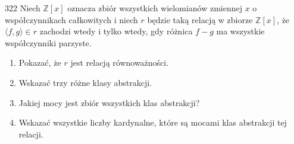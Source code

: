 \documentclass{../note}
\begin{document}
\begin{zadanie}{322}
Niech $\mathbb{Z}[x]$ oznacza zbiór wszystkich wielomianów zmiennej $x$ o współczynnikach całkowitych i niech $r$ będzie taką relacją w zbiorze $\mathbb{Z}[x]$, że $\langle f,g\rangle\in r$ zachodzi wtedy i tylko wtedy, gdy różnica $f-g$ ma wszystkie współczynniki parzyste.
\begin{enumerate}
    \item[(a)] Pokazać, że $r$ jest relacją równoważności.
    \item[(b)] Wskazać trzy różne klasy abstrakcji.
    \item[(c)] Jakiej mocy jest zbiór wszystkich klas abstrakcji?
    \item[(d)] Wskazać wszystkie liczby kardynalne, które są mocami klas abstrakcji tej relacji.
\end{enumerate}
\end{zadanie}
\end{document}
